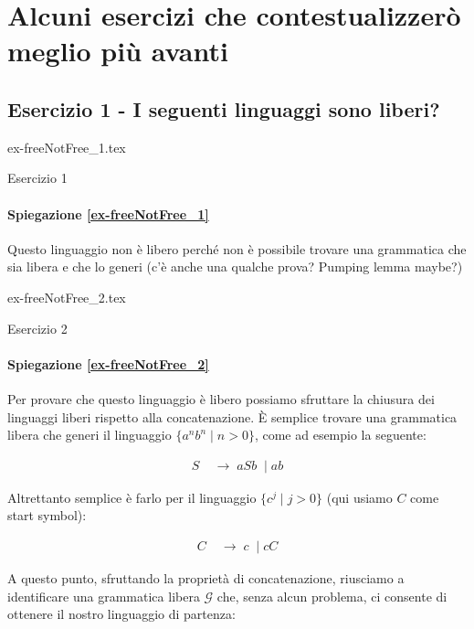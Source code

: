 \documentclass[class=book, crop=false, oneside, 12pt]{standalone}
\begin{document}
\section{Alcuni esercizi che contestualizzerò meglio più avanti}
\subsection*{Esercizio 1 - I seguenti linguaggi sono liberi?}

\begin{table}[H]
	\centering
	{ex-freeNotFree_1.tex}
    \caption{Esercizio 1}
    \label{ex-freeNotFree_1}
\end{table}

\paragraph{Spiegazione \ref{ex-freeNotFree_1}}
Questo linguaggio non è libero perché non è possibile trovare una grammatica che sia libera e che lo generi (c'è anche una qualche prova? Pumping lemma maybe?)

\begin{table}[H]
	\centering
	{ex-freeNotFree_2.tex}
    \caption{Esercizio 2}
    \label{ex-freeNotFree_2}
\end{table}

\paragraph{Spiegazione \ref{ex-freeNotFree_2}}
Per provare che questo linguaggio è libero possiamo sfruttare la chiusura dei linguaggi liberi rispetto alla concatenazione. È semplice trovare una grammatica libera che generi il linguaggio \( \{ a^nb^n \mid n > 0 \} \), come ad esempio la seguente:

\begin{align*}
  S\; & \to\; aSb\; \mid ab
\end{align*}

\noindent Altrettanto semplice è farlo per il linguaggio \( \{ c^j \mid j > 0 \} \) (qui usiamo \(C\) come start symbol):

\begin{align*}
  C\; & \to\; c\; \mid cC
\end{align*}

\noindent A questo punto, sfruttando la proprietà di concatenazione, riusciamo a identificare una grammatica libera \(\mathcal{G}\) che, senza alcun problema, ci consente di ottenere il nostro linguaggio di partenza:
\end{document}
